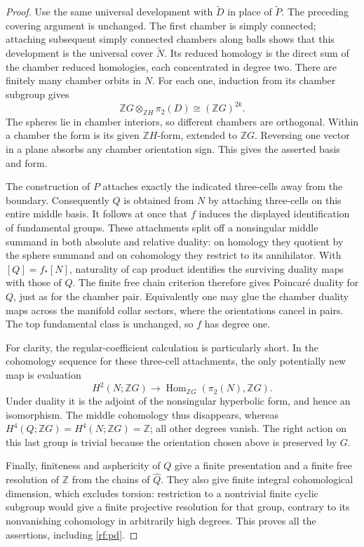 \documentclass[11pt]{article}
\theoremstyle{definition}
\theoremstyle{remark}
\newcommand{\Z}{\mathbb Z}
\begin{document}
\begin{proof}
Use the same universal development with $\widetilde D$ in place of
$\widetilde P$.  The preceding covering argument is unchanged.
The first chamber is simply connected; attaching subsequent simply
connected chambers along balls shows that this development is the
universal cover $\widetilde N$.  Its reduced homology is the direct
sum of the chamber reduced homologies, each concentrated in degree two.
There are finitely many chamber orbits in $N$.  For each one, induction
from its chamber subgroup gives
\[
 \Z G\otimes_{\Z H}\pi_2(D)
       \cong (\Z G)^{2k}.
\]
The spheres lie in chamber interiors, so different chambers are
orthogonal.  Within a chamber the form is its given $\Z H$-form,
extended to $\Z G$.  Reversing one vector in a plane absorbs any
chamber orientation sign.  This gives the asserted basis and form.

The construction of $P$ attaches exactly the indicated three-cells
away from the boundary.  Consequently $Q$ is obtained from $N$ by
attaching three-cells on this entire middle basis.  It follows at
once that $f$ induces the displayed identification of fundamental
groups.  These attachments split off a nonsingular middle summand
in both absolute and relative duality: on homology they quotient
by the sphere summand and on cohomology they restrict to its
annihilator.  With $[Q]=f_*[N]$, naturality of cap product identifies
the surviving duality maps with those of $Q$.  The finite free chain
criterion therefore gives Poincar\'e duality for $Q$, just as for the
chamber pair.  Equivalently one may glue the chamber duality maps
across the manifold collar sectors, where the orientations cancel
in pairs.  The top fundamental class is unchanged, so $f$ has degree
one.

For clarity, the regular-coefficient calculation is particularly
short.  In the cohomology sequence for these three-cell attachments,
the only potentially new map is evaluation
\[
 H^2(N;\Z G)\longrightarrow
       \operatorname{Hom}_{\Z G}(\pi_2(N),\Z G).
\]
Under duality it is the adjoint of the nonsingular hyperbolic form,
and hence an isomorphism.  The middle cohomology thus disappears,
whereas $H^4(Q;\Z G)=H^4(N;\Z G)=\Z$; all other degrees vanish.
The right action on this last group is trivial because the orientation
chosen above is preserved by $G$.

Finally, finiteness and asphericity of $Q$ give a finite presentation
and a finite free resolution of $\Z$ from the chains of $\widehat Q$.
They also give finite integral cohomological dimension, which excludes
torsion: restriction to a nontrivial finite cyclic subgroup would give
a finite projective resolution for that group, contrary to its
nonvanishing cohomology in arbitrarily high degrees.  This proves
all the assertions, including \eqref{rf:pd}.
\end{proof}
\end{document}
